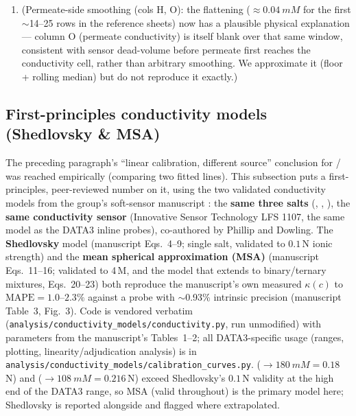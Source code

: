 \documentclass[11pt]{article}
\newcommand{\note}[1]{{\color{blue}\textsf{(#1)}}}
\newcommand{\cint}{c_{\mathrm{int}}}
\begin{document}
\begin{enumerate}[itemsep=2pt]
{    ($+10$--$29\%$ median in $\cint$, salt-dependent; raw-reprocessing
    validation paragraph above) --- see discussion point~11,
    \S\ref{sec:questions}, for the resolved outcome.}
  \item \note{Permeate-side smoothing (cols H, O): the flattening
    ($\approx\SI{0.04}{mM}$ for the first $\sim$14--25 rows in the reference
    sheets) now has a plausible physical explanation --- column O (permeate
    conductivity) is itself blank over that same window, consistent with
    sensor dead-volume before permeate first reaches the conductivity cell,
    rather than arbitrary smoothing. We approximate it (floor + rolling
    median) but do not reproduce it exactly.}
\end{enumerate}

\subsection{First-principles conductivity models (Shedlovsky \& MSA)}\label{sec:condmodels}
The preceding paragraph's ``linear calibration, different source'' conclusion for
/ was reached empirically (comparing two fitted lines). This
subsection puts a first-principles, peer-reviewed number on it, using the two
validated conductivity models from the group's soft-sensor manuscript
\cite{lilonfe2025softsensors}: the \textbf{same three salts} (,
, ), the \textbf{same conductivity sensor} (Innovative Sensor
Technology LFS 1107, the same model as the DATA3 inline probes), co-authored by
Phillip and Dowling. The \textbf{Shedlovsky} model (manuscript Eqs.~4--9; single
salt, validated to $0.1$\,N ionic strength) and the \textbf{mean spherical
approximation (MSA)} (manuscript Eqs.~11--16; validated to 4\,M, and the model
that extends to binary/ternary mixtures, Eqs.~20--23) both reproduce the
manuscript's own measured $\kappa(c)$ to $\text{MAPE}=1.0$--$2.3\%$ against a
probe with $\sim$0.93\% intrinsic precision (manuscript Table~3, Fig.~3). Code is
vendored verbatim (\texttt{analysis/conductivity\_models/conductivity.py}, run
unmodified) with parameters from the manuscript's Tables~1--2; all DATA3-specific
usage (ranges, plotting, linearity/adjudication analysis) is in
\texttt{analysis/conductivity\_models/calibration\_curves.py}. 
($\to\SI{180}{mM}=0.18$\,N) and  ($\to\SI{108}{mM}=0.216$\,N) exceed
Shedlovsky's $0.1$\,N validity at the high end of the DATA3 range, so MSA (valid
throughout) is the primary model here; Shedlovsky is reported alongside and
flagged where extrapolated.
\end{document}
